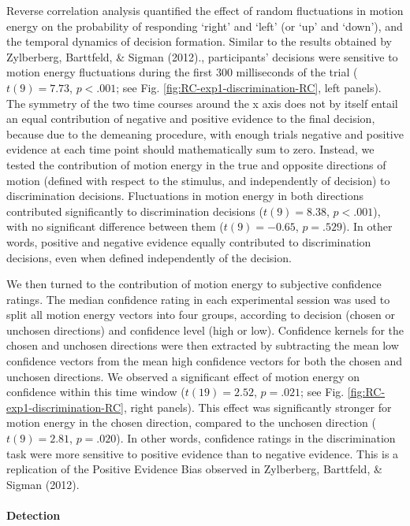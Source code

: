 \documentclass[12pt,twoside]{reedthesis}
\begin{document}
Reverse correlation analysis quantified the effect of random fluctuations in motion energy on the probability of responding `right' and `left' (or `up' and `down'), and the temporal dynamics of decision formation. Similar to the results obtained by Zylberberg, Barttfeld, \& Sigman (2012)., participants' decisions were sensitive to motion energy fluctuations during the first 300 milliseconds of the trial (\(t(9) = 7.73\), \(p < .001\); see Fig. \ref{fig:RC-exp1-discrimination-RC}, left panels). The symmetry of the two time courses around the x axis does not by itself entail an equal contribution of negative and positive evidence to the final decision, because due to the demeaning procedure, with enough trials negative and positive evidence at each time point should mathematically sum to zero. Instead, we tested the contribution of motion energy in the true and opposite directions of motion (defined with respect to the stimulus, and independently of decision) to discrimination decisions. Fluctuations in motion energy in both directions contributed significantly to discrimination decisions (\(t(9) = 8.38\), \(p < .001\)), with no significant difference between them (\(t(9) = -0.65\), \(p = .529\)). In other words, positive and negative evidence equally contributed to discrimination decisions, even when defined independently of the decision.

We then turned to the contribution of motion energy to subjective confidence ratings. The median confidence rating in each experimental session was used to split all motion energy vectors into four groups, according to decision (chosen or unchosen directions) and confidence level (high or low). Confidence kernels for the chosen and unchosen directions were then extracted by subtracting the mean low confidence vectors from the mean high confidence vectors for both the chosen and unchosen directions. We observed a significant effect of motion energy on confidence within this time window (\(t(19) = 2.52\), \(p = .021\); see Fig. \ref{fig:RC-exp1-discrimination-RC}, right panels). This effect was significantly stronger for motion energy in the chosen direction, compared to the unchosen direction (\(t(9) = 2.81\), \(p = .020\)). In other words, confidence ratings in the discrimination task were more sensitive to positive evidence than to negative evidence. This is a replication of the Positive Evidence Bias observed in Zylberberg, Barttfeld, \& Sigman (2012).

\hypertarget{detection}{%
\paragraph*{Detection}\label{detection}}
\end{document}
